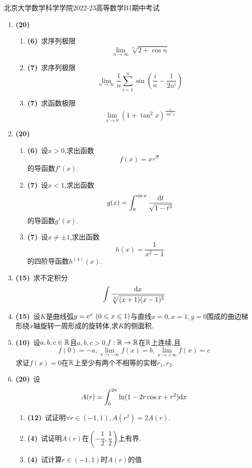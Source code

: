 \documentclass{ctexart}
\begin{document}
\pagestyle{empty}

\begin{center}\Large
    北京大学数学科学学院2022-23高等数学B1期中考试
\end{center}
\begin{enumerate}[leftmargin=*,label=\textbf{\arabic*.}]
    \item \textbf{(20)}
        \begin{enumerate}[label=\textbf{(\arabic*)},leftmargin=*]
            \item \textbf{(6)}\ 求序列极限$$\lim_{n\to\infty}{\sqrt[n]{2+\cos n}}$$
            \item \textbf{(7)}\ 求序列极限$$\lim_{n\to\infty}{\dfrac{1}{n}\sum_{i=1}^{n}{\sin\left(\dfrac{i}{n}-\dfrac{1}{2n^i}\right)}}$$
            \item \textbf{(7)}\ 求函数极限$$\lim_{x\to0}{\left(1+\tan^2 x\right)^{\frac{1}{\sin^2 x}}}$$
        \end{enumerate}
    \item \textbf{(20)}
        \begin{enumerate}[label=\textbf{(\arabic*)},leftmargin=*]
            \item \textbf{(6)}\ 设$x>0$,求出函数$$f(x)=x^{\sqrt{x}}$$的导函数$f'(x)$.
            \item \textbf{(7)}\ 设$x<1$,求出函数$$g(x)=\int_0^{\sin x}\dfrac{\mathrm{d} t}{\sqrt{1-t^3}}$$的导函数$g'(x)$.
            \item \textbf{(7)}\ 设$x\neq\pm 1$,求出函数$$h(x)=\dfrac{1}{x^2-1}$$的四阶导函数$h^{(4)}(x)$.
        \end{enumerate}
    \item \textbf{(15)}\ 求不定积分$$\int{\dfrac{\mathrm{d}x}{\sqrt[3]{(x+1)(x-1)^5}}}$$
    \item \textbf{(15)}\ 设$K$是曲线弧$y=\mathrm{e}^x\ (0\leqslant x\leqslant 1)$与直线$x=0,x=1,y=0$围成的曲边梯形绕$x$轴旋转一周形成的旋转体,求$K$的侧面积.
    \item \textbf{(10)}\ 设$a,b,c\in\mathbb{R}$且$a,b,c>0$,$f:\mathbb{R}\to\mathbb{R}$在$\mathbb{R}$上连续,且$$f(0)=-a,\lim_{x\to-\infty}f(x)=b,\lim_{x\to+\infty}f(x)=c$$求证$f(x)=0$在$\mathbb{R}$上至少有两个不相等的实根$r_1,r_2$.
    \item \textbf{(20)}\ 设$$A(r)=\int_0^{2\pi}\ln(1-2r\cos x+r^2)\mathrm{d} x$$
        \begin{enumerate}[label=\textbf{(\arabic*)},leftmargin=*]
            \item \textbf{(12)}\ 试证明$\displaystyle\forall r\in(-1,1),A(r^2)=2A(r)$.
            \item \textbf{(4)}\ 试证明$A(r)$在$\left(-\dfrac{1}{2},\dfrac{1}{2}\right)$上有界.
            \item \textbf{(4)}\ 试计算$r\in(-1,1)$时$A(r)$的值.
        \end{enumerate}
\end{enumerate}
\end{document}
